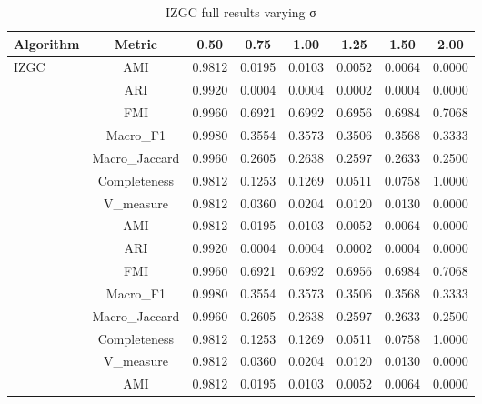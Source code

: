 \begin{table}[ht!]
\centering
\caption{IZGC full results varying σ}
\label{tab:izgc_overlap_sigma_full}
\begin{tabular*}{\linewidth}{@{} lc c c c c c c @{}}
\toprule
Algorithm & Metric & 0.50 & 0.75 & 1.00 & 1.25 & 1.50 & 2.00 \\
\midrule
\multirow{7}{*}{IZGC}
 & AMI  & 0.9812 & 0.0195 & 0.0103 & 0.0052 & 0.0064 & 0.0000 \\

 & ARI  & 0.9920 & 0.0004 & 0.0004 & 0.0002 & 0.0004 & 0.0000 \\

 & FMI  & 0.9960 & 0.6921 & 0.6992 & 0.6956 & 0.6984 & 0.7068 \\

 & Macro_F1  & 0.9980 & 0.3554 & 0.3573 & 0.3506 & 0.3568 & 0.3333 \\

 & Macro_Jaccard  & 0.9960 & 0.2605 & 0.2638 & 0.2597 & 0.2633 & 0.2500 \\

 & Completeness  & 0.9812 & 0.1253 & 0.1269 & 0.0511 & 0.0758 & 1.0000 \\

 & V_measure  & 0.9812 & 0.0360 & 0.0204 & 0.0120 & 0.0130 & 0.0000 \\
\addlinespace
\multirow{7}{*}{IZGC}
 & AMI  & 0.9812 & 0.0195 & 0.0103 & 0.0052 & 0.0064 & 0.0000 \\

 & ARI  & 0.9920 & 0.0004 & 0.0004 & 0.0002 & 0.0004 & 0.0000 \\

 & FMI  & 0.9960 & 0.6921 & 0.6992 & 0.6956 & 0.6984 & 0.7068 \\

 & Macro_F1  & 0.9980 & 0.3554 & 0.3573 & 0.3506 & 0.3568 & 0.3333 \\

 & Macro_Jaccard  & 0.9960 & 0.2605 & 0.2638 & 0.2597 & 0.2633 & 0.2500 \\

 & Completeness  & 0.9812 & 0.1253 & 0.1269 & 0.0511 & 0.0758 & 1.0000 \\

 & V_measure  & 0.9812 & 0.0360 & 0.0204 & 0.0120 & 0.0130 & 0.0000 \\
\addlinespace
\multirow{7}{*}{IZGC}
 & AMI  & 0.9812 & 0.0195 & 0.0103 & 0.0052 & 0.0064 & 0.0000 \\


\end{tabular*}
\end{table}
